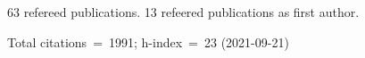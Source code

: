 63 refereed publications. 13 refeered publications as first author.

Total citations~=~1991; h-index~=~23 (2021-09-21)